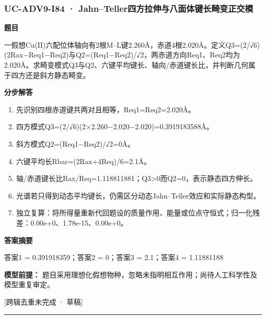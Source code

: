 \documentclass[UTF8,11pt,a4paper]{ctexart}
\begin{document}
\subsubsection*{UC-ADV9-I84 · Jahn–Teller四方拉伸与八面体键长畸变正交模}
\noindent\textbf{题目}\par
一假想Cu(II)六配位体轴向有2根M–L键2.260Å，赤道4根2.020Å。定义Q3=(2/√6)(2Rax−Req1−Req2)与Q2=(Req1−Req2)/√2，两赤道方向Req1、Req2均为2.020Å。求畸变模式Q3与Q2、六键平均键长、轴向/赤道键长比，并判断几何属于四方还是斜方静态畸变。\par
\medskip\noindent\textbf{分步解答}
\begin{enumerate}
\item 先识别四根赤道键共两对且相等，Req1=Req2=2.020Å。
\item 四方模式Q3=(2/√6)(2×2.260−2.020−2.020)=0.3919183588Å。
\item 斜方模式Q2=(Req1−Req2)/√2=0Å。
\item 六键平均长Rbar=(2Rax+4Req)/6=2.1Å。
\item 轴/赤道键长比Rax/Req=1.118811881；Q3>0而Q2=0，表示静态四方伸长。
\item 光谱若只得到动态平均键长，仍需区分动态Jahn–Teller效应和实际静态构型。
\item 独立复算：将所得量重新代回题设的质量作用、能量或位点守恒式；归一化残差：0.00e+0、1.78e-15、0.00e+0。
\end{enumerate}
\noindent\textbf{答案摘要}\par
答案1 = 0.391918359；答案2 = 0；答案3 = 2.1；答案4 = 1.11881188\par
\noindent\textbf{模型前提：}
题目采用理想化假想物种，忽略未指明相互作用；尚待人工科学性及模型重复审定。\par
\noindent\textcolor{red!65!black}{[跨辑去重未完成 · 草稿]} \par
\medskip\hrule\medskip
{}
\end{document}
